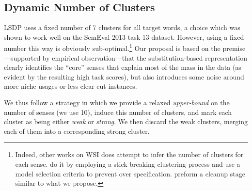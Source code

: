 \documentclass[11pt,a4paper]{article}
\begin{document}
\begin{table}[t!]
\centering
{}

\caption{Evaluation Results on the SemEval 2010 Task 14 Dataset. We report our mean (STD) scores over 10 runs. \textbf{ND}: no dynamic patterns.}
  \label{tab:results2010}
\end{table}


\subsection{Dynamic Number of Clusters}
\label{sec:numc}
LSDP uses a fixed number of 7 clusters for all target words, a choice which was shown to work well on the SemEval 2013 task 13 dataset. However, using a fixed number this way is obviously sub-optimal.\footnote{Indeed, other works on WSI \cite{teh2005sharing,komninos2016structured,hwang2019autosense} does attempt to infer the number of clusters for each sense. \citet{teh2005sharing} do it by employing a stick breaking clustering process and \citet{komninos2016structured} use a model selection criteria to prevent over specification.\citet{hwang2019autosense} preform a cleanup stage similar to what we propose.  } Our proposal is based on the premise---supported by empirical observation---that the substitution-based representation clearly identifies the ``core'' senses that explain most of the mass in the data (as evident by the resulting high task scores), but also introduces some noise around more niche usages or less clear-cut instances.

We thus follow a strategy in which we provide a relaxed \emph{upper-bound} on the number of senses (we use 10), induce this number of clusters, and mark each cluster as being either \emph{weak} or \emph{strong}.  We then discard the weak clusters, merging each of them into a corresponding strong cluster. 
\end{document}
